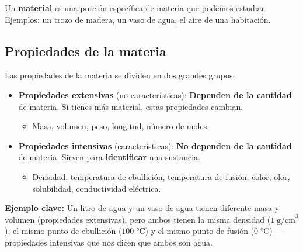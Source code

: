 \documentclass[12pt, letterpaper]{article}
\begin{document}
Un \textbf{material} es una porción específica de materia que podemos estudiar. Ejemplos: un trozo de madera, un vaso de agua, el aire de una habitación.

\subsection{Propiedades de la materia}

Las propiedades de la materia se dividen en dos grandes grupos:

\begin{cuadrosolucion}
  \begin{itemize}[leftmargin=*]
    \item \textbf{Propiedades extensivas} (no características): \textbf{Dependen de la cantidad} de materia. Si tienes más material, estas propiedades cambian.
          \begin{itemize}
            \item Masa, volumen, peso, longitud, número de moles.
          \end{itemize}

    \item \textbf{Propiedades intensivas} (características): \textbf{No dependen de la cantidad} de materia. Sirven para \textbf{identificar} una sustancia.
          \begin{itemize}
            \item Densidad, temperatura de ebullición, temperatura de fusión, color, olor, solubilidad, conductividad eléctrica.
          \end{itemize}
  \end{itemize}
\end{cuadrosolucion}

\begin{cuadroadvertencia}
  \textbf{Ejemplo clave:} Un litro de agua y un vaso de agua tienen diferente masa y volumen (propiedades extensivas), pero ambos tienen la misma densidad ($1\;\text{g/cm}^3$), el mismo punto de ebullición ($100\;°\text{C}$) y el mismo punto de fusión ($0\;°\text{C}$) — propiedades intensivas que nos dicen que ambos son agua.
\end{cuadroadvertencia}
\end{document}
